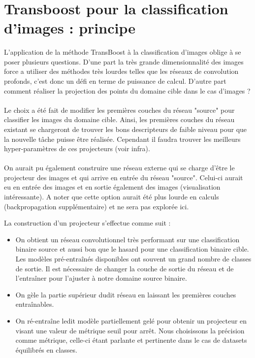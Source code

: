 \documentclass[11 pt]{article}
\begin{document}
\section{Transboost pour la classification d'images : principe}

\paragraph{}L’application de la méthode TransBoost à la classification d’images oblige à se poser plusieurs questions. D’une part la très grande dimensionnalité des images force a utiliser des méthodes très lourdes telles que les réseaux de convolution profonds, c'est donc un défi en terme de puissance de calcul. D’autre part comment réaliser la projection des points du domaine cible dans le cas d'images ?

\paragraph{} Le choix a été fait de modifier les premières couches du réseau "source" pour classifier les images du domaine cible. Ainsi, les premières couches du réseau existant se chargeront de trouver les bons descripteurs de faible niveau pour que la nouvelle tâche puisse être réalisée. Cependant il faudra trouver les meilleurs hyper-paramètres de ces projecteurs (voir infra).

\paragraph{} On aurait pu également construire une réseau externe qui se charge d'être le projecteur des images et qui arrive en entrée du réseau "source". Celui-ci aurait eu en entrée des images et en sortie également des images (visualisation intéressante). A noter que cette option aurait été plus lourde en calculs (backpropagation supplémentaire) et ne sera pas explorée ici.

\pagebreak

\begin{samepage}
La construction d'un projecteur s'effectue comme suit : \medskip
  \begin{itemize}
    \item On obtient un réseau convolutionnel très performant sur une classification binaire source et aussi bon que le hasard pour une classification binaire cible. Les modèles pré-entraînés disponibles ont souvent un grand nombre de classes de sortie. Il est nécessaire de changer la couche de sortie du réseau et de l’entraîner pour l’ajuster à notre domaine source binaire.
    \nopagebreak
    \item On gèle la partie supérieur dudit réseau en laissant les premières couches entraînables.
    \nopagebreak
    \item On ré-entraîne ledit modèle partiellement gelé pour obtenir un projecteur en visant une valeur de métrique seuil pour arrêt. Nous choisissons la précision comme métrique, celle-ci étant parlante et pertinente dans le cas de datasets équilibrés en classes.
  \end{itemize}
\end{samepage}
\end{document}
